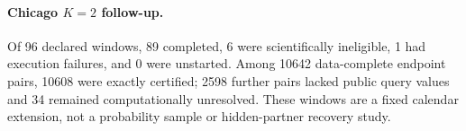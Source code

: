 \paragraph{Chicago $K=2$ follow-up.} Of 96 declared windows, 89 completed, 6 were scientifically ineligible, 1 had execution failures, and 0 were unstarted. Among 10642 data-complete endpoint pairs, 10608 were exactly certified; 2598 further pairs lacked public query values and 34 remained computationally unresolved. These windows are a fixed calendar extension, not a probability sample or hidden-partner recovery study.
